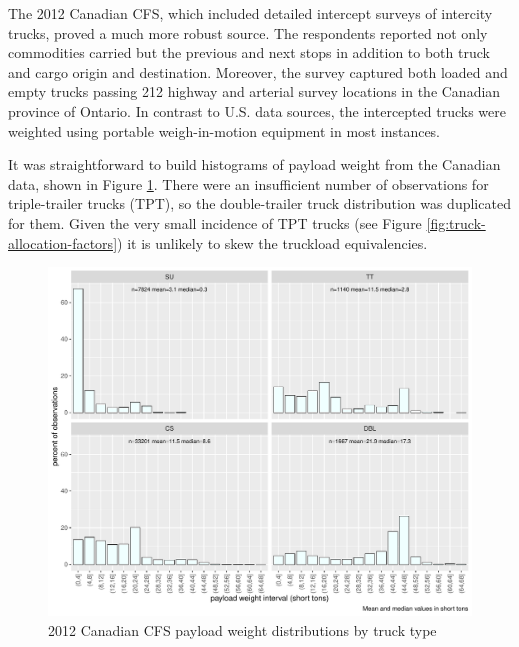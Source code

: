 The 2012 Canadian CFS, which included detailed intercept surveys of intercity trucks, proved a much more robust source. The respondents reported not only commodities carried but the previous and next stops in addition to both truck and cargo origin and destination. Moreover, the survey captured both loaded and empty trucks passing 212 highway and arterial survey locations in the Canadian province of Ontario. In contrast to U.S. data sources, the intercepted trucks were weighted using portable weigh-in-motion equipment in most instances. 

It was straightforward to build histograms of payload weight from the Canadian data, shown in Figure \ref{fig:cvs-weight-distributions}. There were an insufficient number of observations for triple-trailer trucks (TPT), so the double-trailer truck distribution was duplicated for them. Given the very small incidence of TPT trucks (see Figure \ref{fig:truck-allocation-factors}) it is unlikely to skew the truckload equivalencies.

\begin{figure}[!tb]
\centering
\includegraphics[width=6in]{figures/graph-cvs-payload-distributions.pdf}
\caption{2012 Canadian CFS payload weight distributions by truck type}
\label{fig:cvs-weight-distributions}
\end{figure}

